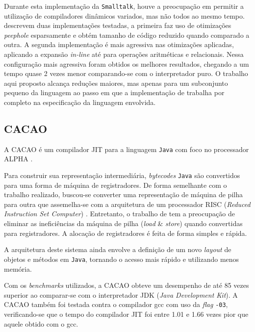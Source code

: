 Durante esta implementação da \texttt{Smalltalk}, houve a preocupação
em permitir a utilização
de compiladores dinâmicos
variados, mas não todos ao mesmo tempo.
 descrevem duas implementações
testadas, a primeira faz uso de otimizações \textit{peephole}
\cite{muchnick} esparsamente e obtém tamanho de código reduzido
quando comparado a outra. A segunda implementação é mais agressiva nas
otimizações aplicadas, aplicando a expansão \textit{in-line} até para
operações aritméticas e relacionais. Nessa configuração mais agressiva
foram obtidos os melhores resultados, chegando a um tempo quase 2
vezes menor comparando-se com o interpretador puro. O trabalho aqui proposto
alcança reduções maiores, mas apenas para um subconjunto
pequeno da linguagem ao passo em que a implementação de
 trabalha por completo na
especificação da linguagem envolvida.


\subsection{CACAO}

A CACAO \cite{cacao} é um compilador JIT para a linguagem
\texttt{Java} com foco no processador ALPHA \cite{alphaproc}.

Para construir sua representação intermediária, \textit{bytecodes}
\texttt{Java} são convertidos para uma forma de máquina de registradores. De
forma semelhante com o trabalho realizado, buscou-se converter uma
representação de máquina de pilha para outra que assemelha-se com a
arquitetura de um processador RISC (\textit{Reduced Instruction Set
  Computer}) \cite{risc}
.
Entretanto, o trabalho de  tem a preocupação
de eliminar as ineficiências da máquina de pilha  (\textit{load} \&
\textit{store}) quando convertidas para registradores.
A alocação de registradores é feita de forma simples e rápida.

A arquitetura deste sistema ainda envolve a definição de um novo
\textit{layout} de objetos e métodos em \texttt{Java}, tornando o
acesso mais rápido e utilizando menos memória.

Com os \textit{benchmarks} utilizados, a CACAO obteve um desempenho de
até 85 vezes superior ao comparar-se com o interpretador JDK
(\textit{Java Development Kit}).
A CACAO também foi testada
contra o compilador gcc \cite{gcc1} com uso da \textit{flag}
\verb!-03!, verificando-se que o tempo do compilador JIT foi
entre 1.01 e 1.66 vezes pior que aquele obtido com o gcc.

